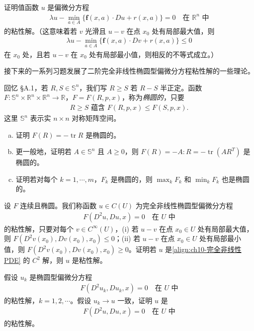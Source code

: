 \documentclass[../../main.tex]{subfiles}
\begin{document}
\begin{exercise}[续。]\label{exercise:ch10-无限时域HJB}证明值函数 $u$ 是偏微分方程
\begin{align*}
\lambda u-\min_{a\in A}\{\mathbf{f}(x,a)\cdot Du+r(x,a)\}=0 \quad \text{在 } \mathbb{R}^n \text{ 中}
\end{align*}
的粘性解。（这意味着若 $v$ 光滑且 $u-v$ 在点 $x_0$ 处有局部最大值，则
\begin{align*}
\lambda u-\min_{a\in A}\{\mathbf{f}(x,a)\cdot Dv+r(x,a)\}\leqslant 0
\end{align*}
在 $x_0$ 处，且若 $u-v$ 在 $x_0$ 处有局部最小值，则相反的不等式成立。）

接下来的一系列习题发展了二阶完全非线性椭圆型偏微分方程粘性解的一些理论。
\end{exercise}

\begin{exercise}\label{exercise:ch10-椭圆性定义}
回忆 \S A.1，若 $R,S\in\mathbb{S}^n$，我们写 $R\geqslant S$ 若 $R-S$ 半正定。函数 $F:\mathbb{S}^n\times\mathbb{R}^n\times\mathbb{R}^n\to\mathbb{R}$，$F=F(R,p,x)$，称为\emph{椭圆的}，只要
\begin{align*}
R\geqslant S \text{ 蕴含 } F(R,p,x)\leqslant F(S,p,x).
\end{align*}
这里 $\mathbb{S}^n$ 表示实 $n\times n$ 对称矩阵空间。
\begin{enumerate}[(a)]
\item 证明 $F(R)=-\operatorname{tr}R$ 是椭圆的。
\item 更一般地，证明若 $A\in\mathbb{S}^n$ 且 $A\geqslant 0$，则 $F(R)=-A:R=-\operatorname{tr}(AR^T)$ 是椭圆的。
\item 证明若对每个 $k=1,\cdots,m$，$F_k$ 是椭圆的，则 $\max_k F_k$ 和 $\min_k F_k$ 也是椭圆的。
\end{enumerate}
\end{exercise}

\begin{exercise}\label{exercise:ch10-完全非线性粘性解}
设 $F$ 连续且椭圆。我们称函数 $u\in C(U)$ 为完全非线性椭圆型偏微分方程
\begin{align}
F(D^2u,Du,x)=0 \quad \text{在 } U \text{ 中}
\label{align:ch10-完全非线性PDE}
\end{align}
的粘性解，只要对每个 $v\in C^\infty(U)$，(i) 若 $u-v$ 在点 $x_0\in U$ 处有局部最大值，则 $F(D^2v(x_0),Dv(x_0),x_0)\leqslant 0$；(ii) 若 $u-v$ 在点 $x_0\in U$ 处有局部最小值，则 $F(D^2v(x_0),Dv(x_0),x_0)\geqslant 0$。证明若 $u$ 是\eqref{align:ch10-完全非线性PDE} 的 $C^2$ 解，则 $u$ 是粘性解。
\end{exercise}

\begin{exercise}\label{exercise:ch10-椭圆一致极限}
假设 $u_k$ 是椭圆型偏微分方程
\begin{align*}
F(D^2u_k,Du_k,x)=0 \quad \text{在 } U \text{ 中}
\end{align*}
的粘性解，$k=1,2,\cdots$。假设 $u_k\to u$ 一致，证明 $u$ 是
\begin{align*}
F(D^2u,Du,x)=0 \quad \text{在 } U \text{ 中}
\end{align*}
的粘性解。
\end{exercise}
\end{document}
